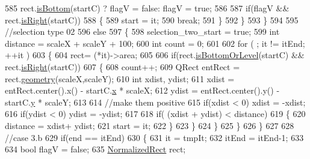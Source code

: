 \begin{DoxyCode}
585                 rect.\hyperlink{classOkular_1_1NormalizedRect_ad7d24b65fc3351cd6dd6eace53d6a6e5}{isBottom}(startC) ? flagV = \textcolor{keyword}{false}: flagV = \textcolor{keyword}{true};
586 
587                 \textcolor{keywordflow}{if}(flagV && rect.\hyperlink{classOkular_1_1NormalizedRect_ad42d751d8a6db695622645a1e1df8962}{isRight}(startC))
588                 \{
589                     start = it;
590                     \textcolor{keywordflow}{break};
591                 \}
592             \}
593         \}
594 
595         \textcolor{comment}{//selection type 02}
596         \textcolor{keywordflow}{else}
597         \{
598             selection\_two\_start = \textcolor{keyword}{true};
599             \textcolor{keywordtype}{int} distance = scaleX + scaleY + 100;
600             \textcolor{keywordtype}{int} count = 0;
601 
602             \textcolor{keywordflow}{for} ( ; it != itEnd; ++it )
603             \{
604                 rect= (*it)->area;
605 
606                 \textcolor{keywordflow}{if}(rect.\hyperlink{classOkular_1_1NormalizedRect_a97cba414c1e1e096ddeb9e93ad1fe86d}{isBottomOrLevel}(startC) && rect.\hyperlink{classOkular_1_1NormalizedRect_ad42d751d8a6db695622645a1e1df8962}{isRight}(startC))
607                 \{
608                     count++;
609                     QRect entRect = rect.\hyperlink{classOkular_1_1NormalizedRect_a006897c5fcff2c3a97b4141f1a967513}{geometry}(scaleX,scaleY);
610                     \textcolor{keywordtype}{int} xdist, ydist;
611                     xdist = entRect.center().x() - startC.\hyperlink{classOkular_1_1NormalizedPoint_a857f49b9bc7712430d167472ef9dbd94}{x} * scaleX;
612                     ydist = entRect.center().y() - startC.\hyperlink{classOkular_1_1NormalizedPoint_ac2276daabda627d5f82bb1532c293047}{y} * scaleY;
613 
614                     \textcolor{comment}{//make them positive}
615                     \textcolor{keywordflow}{if}(xdist < 0) xdist = -xdist;
616                     \textcolor{keywordflow}{if}(ydist < 0) ydist = -ydist;
617 
618                     \textcolor{keywordflow}{if}( (xdist + ydist) < distance)
619                     \{
620                         distance = xdist+ ydist;
621                         start = it;
622                     \}
623                 \}
624             \}
625         \}
626     \}
627 
628     \textcolor{comment}{//case 3.b}
629     \textcolor{keywordflow}{if}(end == itEnd)
630     \{
631         it = tmpIt;
632         itEnd = itEnd-1;
633 
634         \textcolor{keywordtype}{bool} flagV = \textcolor{keyword}{false};
635         \hyperlink{classOkular_1_1NormalizedRect}{NormalizedRect} rect;

\end{DoxyCode}
